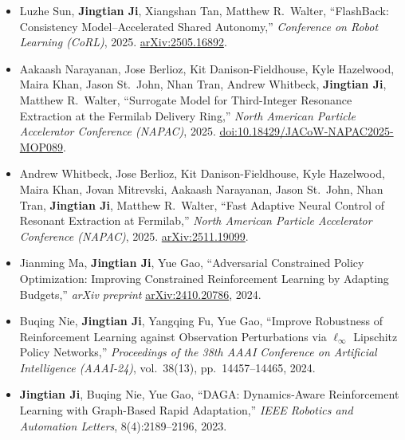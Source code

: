 \documentclass[10pt,letterpaper]{article}
\newcommand{\me}{\textbf{Jingtian Ji}}
\begin{document}
\begin{itemize}
  \item Luzhe Sun, \me, Xiangshan Tan, Matthew R.\ Walter, ``FlashBack: Consistency Model--Accelerated Shared Autonomy,'' \textit{Conference on Robot Learning (CoRL)}, 2025. \href{https://arxiv.org/abs/2505.16892}{arXiv:2505.16892}.

  \item Aakaash Narayanan, Jose Berlioz, Kit Danison-Fieldhouse, Kyle Hazelwood, Maira Khan, Jason St.\ John, Nhan Tran, Andrew Whitbeck, \me, Matthew R.\ Walter, ``Surrogate Model for Third-Integer Resonance Extraction at the Fermilab Delivery Ring,'' \textit{North American Particle Accelerator Conference (NAPAC)}, 2025. \href{https://doi.org/10.18429/JACoW-NAPAC2025-MOP089}{doi:10.18429/JACoW-NAPAC2025-MOP089}.

  \item Andrew Whitbeck, Jose Berlioz, Kit Danison-Fieldhouse, Kyle Hazelwood, Maira Khan, Jovan Mitrevski, Aakaash Narayanan, Jason St.\ John, Nhan Tran, \me, Matthew R.\ Walter, ``Fast Adaptive Neural Control of Resonant Extraction at Fermilab,'' \textit{North American Particle Accelerator Conference (NAPAC)}, 2025. \href{https://arxiv.org/abs/2511.19099}{arXiv:2511.19099}.

  \item Jianming Ma, \me, Yue Gao, ``Adversarial Constrained Policy Optimization: Improving Constrained Reinforcement Learning by Adapting Budgets,'' \textit{arXiv preprint} \href{https://arxiv.org/abs/2410.20786}{arXiv:2410.20786}, 2024.

  \item Buqing Nie, \me, Yangqing Fu, Yue Gao, ``Improve Robustness of Reinforcement Learning against Observation Perturbations via $\ell_\infty$ Lipschitz Policy Networks,'' \textit{Proceedings of the 38th AAAI Conference on Artificial Intelligence (AAAI-24)}, vol.\ 38(13), pp.\ 14457--14465, 2024.

  \item \me, Buqing Nie, Yue Gao, ``DAGA: Dynamics-Aware Reinforcement Learning with Graph-Based Rapid Adaptation,'' \textit{IEEE Robotics and Automation Letters}, 8(4):2189--2196, 2023.
\end{itemize}

\end{document}
